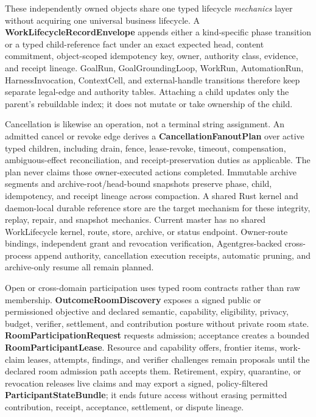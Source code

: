 \documentclass[
  11pt,
]{article}
\begin{document}
These independently owned objects share one typed lifecycle \emph{mechanics}
layer without acquiring one universal business lifecycle. A
\textbf{WorkLifecycleRecordEnvelope} appends either a kind-specific phase
transition or a typed child-reference fact under an exact expected head,
content commitment, object-scoped idempotency key, owner, authority class,
evidence, and receipt lineage. GoalRun, GoalGroundingLoop, WorkRun,
AutomationRun, HarnessInvocation, ContextCell, and external-handle transitions
therefore keep separate legal-edge and authority tables. Attaching a child
updates only the parent's rebuildable index; it does not mutate or take
ownership of the child.

Cancellation is likewise an operation, not a terminal string assignment. An
admitted cancel or revoke edge derives a \textbf{CancellationFanoutPlan} over
active typed children, including drain, fence, lease-revoke, timeout,
compensation, ambiguous-effect reconciliation, and receipt-preservation duties
as applicable. The plan never claims those owner-executed actions completed.
Immutable archive segments and archive-root/head-bound snapshots preserve
phase, child, idempotency, and receipt lineage across compaction. A shared Rust
kernel and daemon-local durable reference store are the target mechanism for
these integrity, replay, repair, and snapshot mechanics. Current master has no
shared WorkLifecycle kernel, route, store, archive, or status endpoint.
Owner-route bindings, independent grant and revocation verification,
Agentgres-backed cross-process append authority, cancellation execution
receipts, automatic pruning, and archive-only resume all remain planned.

Open or cross-domain participation uses typed room contracts rather than raw
membership. \textbf{OutcomeRoomDiscovery} exposes a signed public or
permissioned objective and declared semantic, capability, eligibility,
privacy, budget, verifier, settlement, and contribution posture without
private room state. \textbf{RoomParticipationRequest} requests admission;
acceptance creates a bounded \textbf{RoomParticipantLease}. Resource and
capability offers, frontier items, work-claim leases, attempts, findings, and
verifier challenges remain proposals until the declared room admission path
accepts them. Retirement, expiry, quarantine, or revocation releases live
claims and may export a signed, policy-filtered
\textbf{ParticipantStateBundle}; it ends future access without erasing
permitted contribution, receipt, acceptance, settlement, or dispute lineage.
\end{document}
